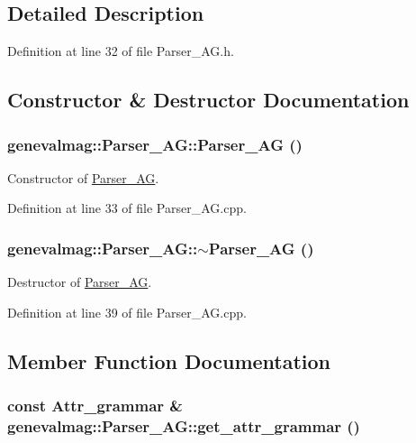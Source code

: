 \subsection{Detailed Description}


Definition at line 32 of file Parser\_\-AG.h.

\subsection{Constructor \& Destructor Documentation}
\hypertarget{classgenevalmag_1_1Parser__AG_107da8e92db8c44204471982619ff339}{
\subsubsection[{Parser\_\-AG}]{\setlength{\rightskip}{0pt plus 5cm}genevalmag::Parser\_\-AG::Parser\_\-AG ()}}
\label{classgenevalmag_1_1Parser__AG_107da8e92db8c44204471982619ff339}


Constructor of \hyperlink{classgenevalmag_1_1Parser__AG}{Parser\_\-AG}. 

Definition at line 33 of file Parser\_\-AG.cpp.\hypertarget{classgenevalmag_1_1Parser__AG_834ddbb83e5822f485d16cdc432762cf}{
\subsubsection[{$\sim$Parser\_\-AG}]{\setlength{\rightskip}{0pt plus 5cm}genevalmag::Parser\_\-AG::$\sim$Parser\_\-AG ()}}
\label{classgenevalmag_1_1Parser__AG_834ddbb83e5822f485d16cdc432762cf}


Destructor of \hyperlink{classgenevalmag_1_1Parser__AG}{Parser\_\-AG}. 

Definition at line 39 of file Parser\_\-AG.cpp.

\subsection{Member Function Documentation}
\hypertarget{classgenevalmag_1_1Parser__AG_c6b25c2c2cb50461c50ba50c186a3b42}{
\subsubsection[{get\_\-attr\_\-grammar}]{\setlength{\rightskip}{0pt plus 5cm}const {\bf Attr\_\-grammar} \& genevalmag::Parser\_\-AG::get\_\-attr\_\-grammar ()}}
\label{classgenevalmag_1_1Parser__AG_c6b25c2c2cb50461c50ba50c186a3b42}


